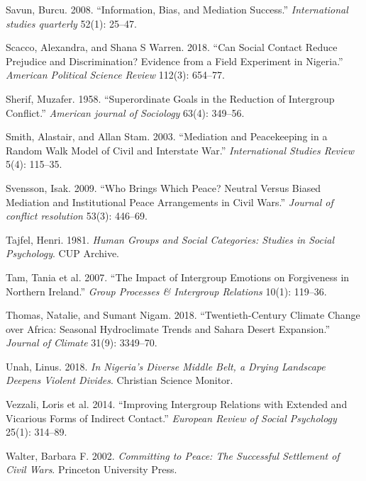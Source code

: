 \documentclass[11pt]{article}
\begin{document}
\leavevmode\hypertarget{ref-savun2008information}{}%
Savun, Burcu. 2008. ``Information, Bias, and Mediation Success.''
\emph{International studies quarterly} 52(1): 25--47.

\leavevmode\hypertarget{ref-scacco2018nigeria}{}%
Scacco, Alexandra, and Shana S Warren. 2018. ``Can Social Contact Reduce
Prejudice and Discrimination? Evidence from a Field Experiment in
Nigeria.'' \emph{American Political Science Review} 112(3): 654--77.

\leavevmode\hypertarget{ref-sherif1958superordinate}{}%
Sherif, Muzafer. 1958. ``Superordinate Goals in the Reduction of
Intergroup Conflict.'' \emph{American journal of Sociology} 63(4):
349--56.

\leavevmode\hypertarget{ref-smith2003mediation}{}%
Smith, Alastair, and Allan Stam. 2003. ``Mediation and Peacekeeping in a
Random Walk Model of Civil and Interstate War.'' \emph{International
Studies Review} 5(4): 115--35.

\leavevmode\hypertarget{ref-svensson2009brings}{}%
Svensson, Isak. 2009. ``Who Brings Which Peace? Neutral Versus Biased
Mediation and Institutional Peace Arrangements in Civil Wars.''
\emph{Journal of conflict resolution} 53(3): 446--69.

\leavevmode\hypertarget{ref-tajfel1981groups}{}%
Tajfel, Henri. 1981. \emph{Human Groups and Social Categories: Studies
in Social Psychology}. CUP Archive.

\leavevmode\hypertarget{ref-tam2007impact}{}%
Tam, Tania et al. 2007. ``The Impact of Intergroup Emotions on
Forgiveness in Northern Ireland.'' \emph{Group Processes \& Intergroup
Relations} 10(1): 119--36.

\leavevmode\hypertarget{ref-thomas2018sahara}{}%
Thomas, Natalie, and Sumant Nigam. 2018. ``Twentieth-Century Climate
Change over Africa: Seasonal Hydroclimate Trends and Sahara Desert
Expansion.'' \emph{Journal of Climate} 31(9): 3349--70.

\leavevmode\hypertarget{ref-unah2018nigeria}{}%
Unah, Linus. 2018. \emph{In Nigeria's Diverse Middle Belt, a Drying
Landscape Deepens Violent Divides}. Christian Science Monitor.

\leavevmode\hypertarget{ref-vezzali2014indirect}{}%
Vezzali, Loris et al. 2014. ``Improving Intergroup Relations with
Extended and Vicarious Forms of Indirect Contact.'' \emph{European
Review of Social Psychology} 25(1): 314--89.

\leavevmode\hypertarget{ref-walter2002committing}{}%
Walter, Barbara F. 2002. \emph{Committing to Peace: The Successful
Settlement of Civil Wars}. Princeton University Press.
\end{document}
